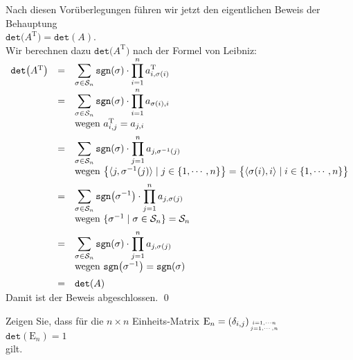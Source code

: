 Nach diesen Vor\"uberlegungen f\"uhren wir jetzt den eigentlichen Beweis der Behauptung
\\[0.2cm]
\hspace*{1.3cm}
$\mathtt{det}\bigl(A^\mathrm{T}\bigr) = \mathtt{det}(A)$.
\\[0.2cm]
Wir berechnen dazu $\mathtt{det}\bigl(A^\mathrm{T}\bigr)$ nach der Formel von Leibniz:
\\[0.2cm]
\hspace*{1.3cm}
$
\begin{array}[t]{lcl}
      \mathtt{det}\bigl(A^\mathrm{T}\bigr) 
& = & \displaystyle\sum\limits_{\sigma\in\mathcal{S}_n} \mathtt{sgn}(\sigma) \cdot \prod\limits_{i=1}^n a_{i,\sigma(i)}^\mathrm{T} \\[0.4cm] 
& = & \displaystyle\sum\limits_{\sigma\in\mathcal{S}_n} \mathtt{sgn}(\sigma) \cdot \prod\limits_{i=1}^n a_{\sigma(i),i} \\[0.4cm] 
&   & \mbox{wegen $a_{i,j}^\mathrm{T} = a_{j,i}$} \\[0.2cm] 
& = & \displaystyle\sum\limits_{\sigma\in\mathcal{S}_n} \mathtt{sgn}(\sigma) \cdot \prod\limits_{j=1}^n a_{j,\sigma^{-1}(j)} \\[0.4cm] 
&   & \mbox{wegen $\bigl\{ \langle j, \sigma^{-1}(j)\rangle \mid j \in \{1,\cdots,n\} \bigr\} = \bigl\{ \langle \sigma(i),i\rangle \mid i \in \{1,\cdots,n\} \bigr\}$} 
      \\[0.2cm] 
& = & \displaystyle\sum\limits_{\sigma\in\mathcal{S}_n} \mathtt{sgn}\bigl(\sigma^{-1}\bigr) \cdot \prod\limits_{j=1}^n a_{j,\sigma(j)} \\[0.4cm] 
&   & \mbox{wegen $\{ \sigma^{-1} \mid \sigma \in \mathcal{S}_n \} = \mathcal{S}_n$} \\[0.2cm] 
& = & \displaystyle\sum\limits_{\sigma\in\mathcal{S}_n} \mathtt{sgn}(\sigma) \cdot \prod\limits_{j=1}^n a_{j,\sigma(j)} \\[0.4cm] 
&   & \mbox{wegen $\mathtt{sgn}\bigl(\sigma^{-1}\bigr) = \mathtt{sgn}(\sigma)$} \\[0.2cm] 
& = & \mathtt{det}(A)
\end{array}
$
\\[0.2cm]
Damit ist der Beweis abgeschlossen.  \qed

\exercise
Zeigen Sie, dass f\"ur die $n \times n$ Einheits-Matrix $\mathrm{E}_n = (\delta_{i,j})_{{i =1,\cdots n} \atop {j=1,\cdots,n}}$
\\[0.2cm]
\hspace*{1.3cm}
$\mathtt{det}(\mathrm{E}_n) = 1$
\\[0.2cm]
gilt. 
\eoxs

